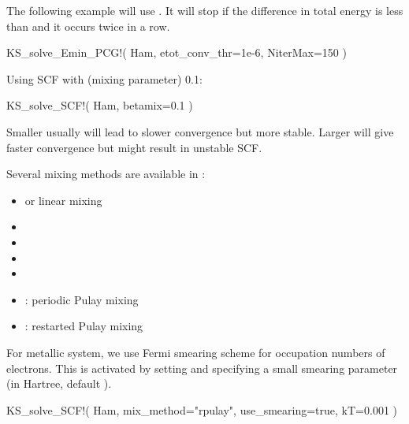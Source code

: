 The following example will use .
It will stop if the difference in total energy is less than
 and it occurs twice in a row.
\begin{juliacode}
KS_solve_Emin_PCG!( Ham, etot_conv_thr=1e-6, NiterMax=150 )
\end{juliacode}

Using SCF with  (mixing parameter) 0.1:
\begin{juliacode}
KS_solve_SCF!( Ham, betamix=0.1 )
\end{juliacode}

Smaller  usually will lead to slower convergence but more stable.
Larger  will give faster convergence but might result in unstable
SCF.

Several mixing methods are available in :
\begin{itemize}
\item {} or linear mixing
\item {}
\item {}
\item {}
\item {}
\item {}: periodic Pulay mixing
\item {}: restarted Pulay mixing
\end{itemize}

For metallic system, we use Fermi smearing scheme for occupation numbers of electrons.
This is activated by setting  and
specifying a small smearing parameter 
(in Hartree, default ).

\begin{juliacode}
KS_solve_SCF!( Ham, mix_method="rpulay", use_smearing=true, kT=0.001 )
\end{juliacode}

